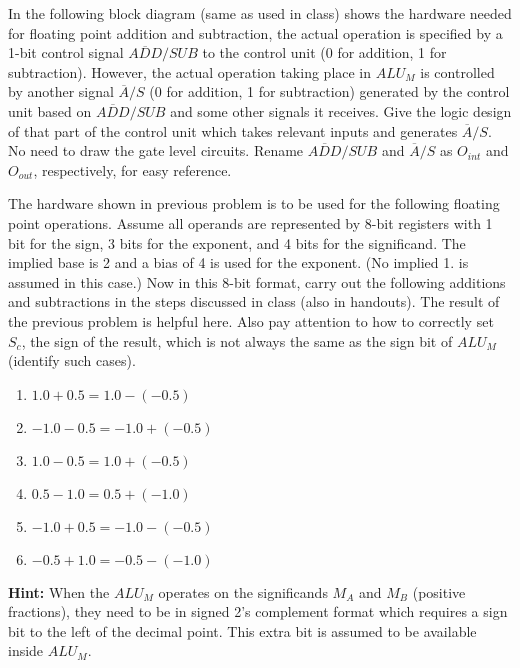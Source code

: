 \item   In the following block diagram (same as used in class) shows the hardware 
        needed for floating point addition and subtraction, the actual operation
        is specified by a 1-bit control signal $\overline{ADD}/SUB$ to the control
        unit (0 for addition, 1 for subtraction). However, the actual operation taking
        place in $ALU_M$ is controlled by another signal $\overline{A}/S$ (0 for addition,
        1 for subtraction) generated by the control unit based on $\overline{ADD}/SUB$
        and some other signals it receives. Give the logic design of that part of the 
        control unit which takes relevant inputs and generates $\overline{A}/S$. No need
        to draw the gate level circuits. Rename $\overline{ADD}/SUB$ and $\overline{A}/S$
        as $O_{int}$ and $O_{out}$, respectively, for easy reference.


\newpage
\item   The hardware shown in previous problem is to be used for the following floating
        point operations. Assume all operands are represented by 8-bit registers with 1 
        bit for the sign, 3 bits for the exponent, and 4 bits for the significand. The
        implied base is 2 and a bias of 4 is used for the exponent. (No implied 1. is
        assumed in this case.) Now in this 8-bit format, carry out the following additions
        and subtractions in the steps discussed in class (also in handouts). The result of
        the previous problem is helpful here. Also pay attention to how to correctly set
        $S_c$, the sign of the result, which is not always the same as the sign bit of 
        $ALU_M$ (identify such cases). 

        \begin{enumerate}
        \item   $1.0+0.5=1.0-(-0.5)$
        \item   $-1.0-0.5=-1.0+(-0.5)$
        \item   $1.0-0.5=1.0+(-0.5)$
        \item   $0.5-1.0=0.5+(-1.0)$
        \item   $-1.0+0.5=-1.0-(-0.5)$
        \item   $-0.5+1.0=-0.5-(-1.0)$
        \end{enumerate}
        {\bf Hint:} When the $ALU_M$ operates on the significands $M_A$ and $M_B$
        (positive fractions), they need to be in signed 2's complement format which 
        requires a sign bit to the left of the decimal point. This extra bit is 
        assumed to be available inside $ALU_M$. 

